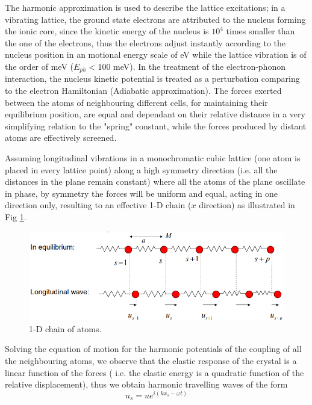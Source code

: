 \documentclass[openany,11pt,a4paper]{report}
\begin{document}
The harmonic approximation is used to describe the lattice excitations; in a vibrating lattice, the ground state electrons are attributed to the nucleus forming the ionic core, since the kinetic energy of the nucleus is $10^{4}$  times smaller than the one of the electrons, thus the electrons adjust instantly according to the nucleus position in an motional energy scale of eV while the lattice vibration is of the order of meV ($E_{ph}<100$ meV). In the treatment of the electron-phonon interaction, the nucleus kinetic potential is treated as a perturbation comparing to the electron Hamiltonian (Adiabatic approximation).
 The forces exerted between the atoms of neighbouring different cells, for maintaining their equilibrium position, are equal and dependant on their relative distance in a very simplifying relation to the "spring" constant, while the forces produced by distant atoms are effectively screened. 
 
 
Assuming longitudinal vibrations in a monochromatic cubic lattice (one atom is placed in every lattice point) along a high symmetry direction (i.e. all the distances in the plane remain constant) where all the atoms of the plane oscillate in phase, by symmetry the forces will be uniform and equal, acting in one direction only, resulting to an effective 1-D chain ($x$ direction) as illustrated in Fig \ref{1D}. \cite{CM1}
  
  
\begin{figure}[H]
\centering
\includegraphics[scale=0.6]{1Dchain.PNG}
\caption{1-D chain of atoms. \cite{phonons}}
\label{1D}
\end{figure}
    

  
Solving the equation of motion for the harmonic potentials of the coupling of all the neighbouring atoms, we observe that the elastic response of the crystal is a linear function of the forces ( i.e.  the elastic energy is a quadratic function of the relative displacement), thus we obtain harmonic travelling waves of the form  
\begin{equation}
u_{s}= u e^{i(kx_{s}- \omega t)}
\end{equation}
\end{document}
